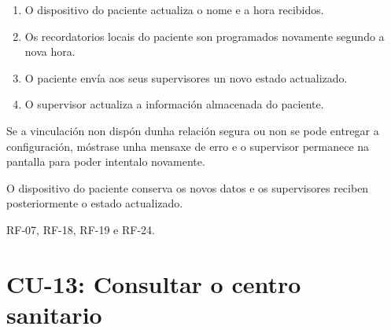 \begin{description}
\begin{enumerate}
    \item O dispositivo do paciente actualiza o nome e a hora recibidos.

    \item Os recordatorios locais do paciente son programados novamente segundo
    a nova hora.

    \item O paciente envía aos seus supervisores un novo estado actualizado.

    \item O supervisor actualiza a información almacenada do paciente.
\end{enumerate}

\item[Fluxos alternativos:] Se a vinculación non dispón dunha relación segura ou
non se pode entregar a configuración, móstrase unha mensaxe de erro e o
supervisor permanece na pantalla para poder intentalo novamente.

\item[Postcondicións:] O dispositivo do paciente conserva os novos datos e os
supervisores reciben posteriormente o estado actualizado.

\item[Requisitos relacionados:] RF-07, RF-18, RF-19 e RF-24.

\end{description}



\section{CU-13: Consultar o centro sanitario}
\label{cu:consultar-centro}

